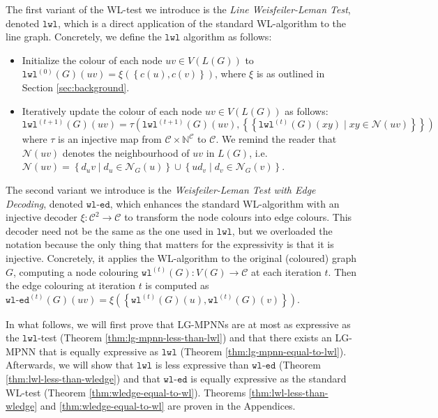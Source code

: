 \documentclass{article}
\newcommand{\set}[1]{\left\{#1\right\}}
\newcommand{\multiset}[1]{\left\{\!\!\left\{#1\right\}\!\!\right\}}
\newcommand{\iter}[1]{^{(#1)}}
\newcommand{\wl}{\texttt{wl}}
\newcommand{\wledge}{\texttt{wl-ed}}
\newcommand{\lwl}{\texttt{lwl}}
\newcommand{\dec}{\xi}
\newcommand{\hash}{\tau}
\newcommand{\nbh}{\mathcal{N}}
\newcommand{\mcc}{\mathcal{C}}
\newcommand{\mbn}{\mathbb{N}}
\begin{document}
The first variant of the WL-test we introduce is the \emph{Line Weisfeiler-Leman Test}, denoted $\lwl$, which is a direct application of the standard WL-algorithm to the line graph. Concretely, we define the $\lwl$ algorithm as follows:
\begin{itemize}
    \item Initialize the colour of each node $uv \in V(L(G))$ to $\lwl\iter{0}(G)(uv) = \dec(\set{c(u),c(v)})$, where $\dec$ is as outlined in Section \ref{sec:background}.
    \item Iteratively update the colour of each node $uv \in V(L(G))$ as follows:
    \begin{equation}
        \lwl\iter{t+1}(G)(uv) = \hash\left(\lwl\iter{t+1}(G)(uv), \multiset{\lwl\iter{t}(G)(xy) \mid xy \in \nbh(uv)}\right)
    \end{equation}
    where $\hash$ is an injective map from $\mcc\times\mbn^\mcc$ to $\mcc$. We remind the reader that $\nbh(uv)$ denotes the neighbourhood of $uv$ in $L(G)$, i.e. $\nbh(uv) = \set{d_uv \mid d_u \in \nbh_G(u)} \cup \set{ud_v \mid d_v \in \nbh_G(v)}$.
\end{itemize}
The second variant we introduce is the \emph{Weisfeiler-Leman Test with Edge Decoding}, denoted $\wledge$, which enhances the standard WL-algorithm with an injective decoder $\dec: \mcc^2\rightarrow\mcc$ to transform the node colours into edge colours. 
This decoder need not be the same as the one used in $\lwl$, but we overloaded the notation because the only thing that matters for the expressivity is that it is injective.
Concretely, it applies the WL-algorithm to the original (coloured) graph $G$, computing a node colouring $\wl\iter{t}(G): V(G) \rightarrow \mcc$ at each iteration $t$. Then the edge colouring at iteration $t$ is computed as $\wledge\iter{t}(G)(uv) = \dec(\set{\wl\iter{t}(G)(u),\wl\iter{t}(G)(v)})$.


In what follows, we will first prove that LG-MPNNs are at most as expressive as the $\lwl$-test (Theorem \ref{thm:lg-mpnn-less-than-lwl}) and that there exists an LG-MPNN that is equally expressive as $\lwl$ (Theorem \ref{thm:lg-mpnn-equal-to-lwl}).
Afterwards, we will show that $\lwl$ is less expressive than $\wledge$ (Theorem \ref{thm:lwl-less-than-wledge}) and that $\wledge$ is equally expressive as the standard WL-test (Theorem \ref{thm:wledge-equal-to-wl}). Theorems \ref{thm:lwl-less-than-wledge} and \ref{thm:wledge-equal-to-wl} are proven in the Appendices.
\end{document}
